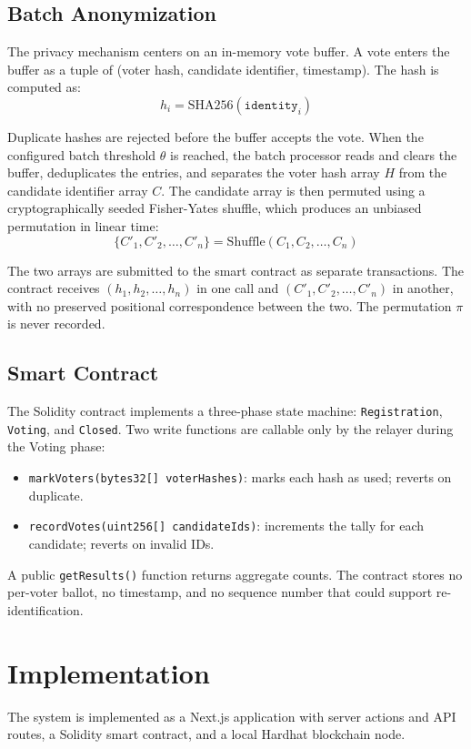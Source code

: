 \documentclass{ieeeaccess}
\begin{document}
\subsection{Batch Anonymization}
The privacy mechanism centers on an in-memory vote buffer. A vote enters the buffer as a tuple of (voter hash, candidate identifier, timestamp). The hash is computed as:
\begin{equation}
h_i = \mathrm{SHA256}(\mathtt{identity}_i)
\label{eq:hash}
\end{equation}

Duplicate hashes are rejected before the buffer accepts the vote. When the configured batch threshold $\theta$ is reached, the batch processor reads and clears the buffer, deduplicates the entries, and separates the voter hash array $H$ from the candidate identifier array $C$. The candidate array is then permuted using a cryptographically seeded Fisher-Yates shuffle, which produces an unbiased permutation in linear time:
\begin{equation}
\{C'_1, C'_2, \ldots, C'_n\} = \mathrm{Shuffle}(C_1, C_2, \ldots, C_n)
\label{eq:shuffle}
\end{equation}

The two arrays are submitted to the smart contract as separate transactions. The contract receives $(h_1, h_2, \ldots, h_n)$ in one call and $(C'_1, C'_2, \ldots, C'_n)$ in another, with no preserved positional correspondence between the two. The permutation $\pi$ is never recorded.

\subsection{Smart Contract}
The Solidity contract implements a three-phase state machine: \texttt{Registration}, \texttt{Voting}, and \texttt{Closed}. Two write functions are callable only by the relayer during the Voting phase:
\begin{itemize}
    \item \texttt{markVoters(bytes32[] voterHashes)}: marks each hash as used; reverts on duplicate.
    \item \texttt{recordVotes(uint256[] candidateIds)}: increments the tally for each candidate; reverts on invalid IDs.
\end{itemize}
A public \texttt{getResults()} function returns aggregate counts. The contract stores no per-voter ballot, no timestamp, and no sequence number that could support re-identification.

\section{Implementation}
The system is implemented as a Next.js application with server actions and API routes, a Solidity smart contract, and a local Hardhat blockchain node.
\end{document}
